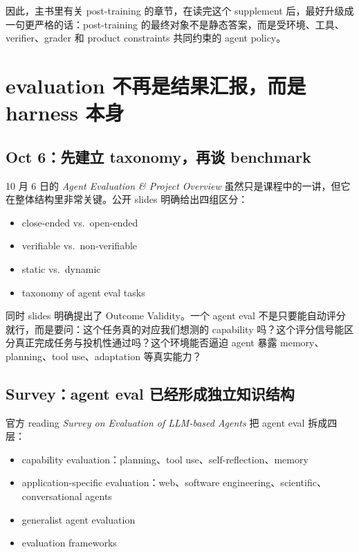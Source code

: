 因此，主书里有关 post-training 的章节，在读完这个 supplement 后，最好升级成一句更严格的话：post-training 的最终对象不是静态答案，而是受环境、工具、verifier、grader 和 product constraints 共同约束的 agent policy。

\section{evaluation 不再是结果汇报，而是 harness 本身}

\subsection{Oct 6：先建立 taxonomy，再谈 benchmark}

10 月 6 日的 \emph{Agent Evaluation \& Project Overview} 虽然只是课程中的一讲，但它在整体结构里非常关键。公开 slides 明确给出四组区分：

\begin{itemize}
\item close-ended vs.\ open-ended
\item verifiable vs.\ non-verifiable
\item static vs.\ dynamic
\item taxonomy of agent eval tasks
\end{itemize}

同时 slides 明确提出了 Outcome Validity。一个 agent eval 不是只要能自动评分就行，而是要问：这个任务真的对应我们想测的 capability 吗？这个评分信号能区分真正完成任务与投机性通过吗？这个环境能否逼迫 agent 暴露 memory、planning、tool use、adaptation 等真实能力？

\subsection{Survey：agent eval 已经形成独立知识结构}

官方 reading \emph{Survey on Evaluation of LLM-based Agents} 把 agent eval 拆成四层：

\begin{itemize}
\item capability evaluation：planning、tool use、self-reflection、memory
\item application-specific evaluation：web、software engineering、scientific、conversational agents
\item generalist agent evaluation
\item evaluation frameworks
\end{itemize}

